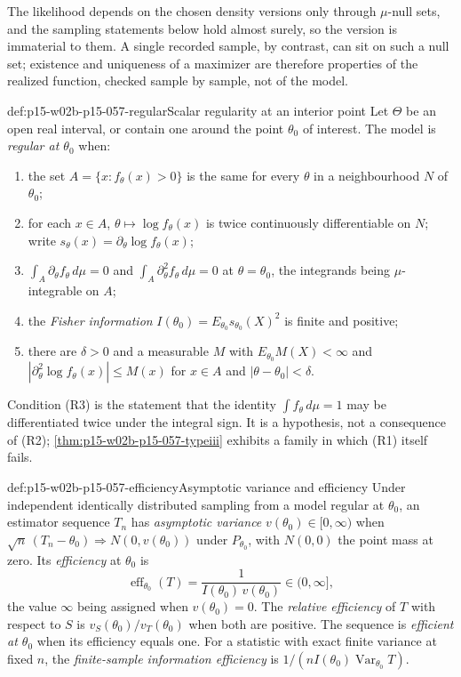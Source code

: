The likelihood depends on the chosen density versions only through
\(\mu\)-null sets, and the sampling statements below hold almost surely,
so the version is immaterial to them. A single recorded sample, by
contrast, can sit on such a null set; existence and uniqueness of a
maximizer are therefore properties of the realized function, checked
sample by sample, not of the model.

\begin{hbdefinition}{def:p15-w02b-p15-057-regular}{Scalar regularity at an interior point}
Let \(\Theta\) be an open real interval, or contain one around the point
\(\theta_0\) of interest. The model is \emph{regular at \(\theta_0\)} when:
\begin{enumerate}
\item[(R1)] the set \(A=\{x:f_\theta(x)>0\}\) is the same for every
 \(\theta\) in a neighbourhood \(N\) of \(\theta_0\);
\item[(R2)] for each \(x\in A\), \(\theta\mapsto\log f_\theta(x)\) is twice
 continuously differentiable on \(N\); write
 \(s_\theta(x)=\partial_\theta\log f_\theta(x)\);
\item[(R3)] \(\int_A\partial_\theta f_\theta\,d\mu=0\) and
 \(\int_A\partial_\theta^2f_\theta\,d\mu=0\) at \(\theta=\theta_0\), the
 integrands being \(\mu\)-integrable on \(A\);
\item[(R4)] the \emph{Fisher information}
 \(I(\theta_0)=E_{\theta_0}s_{\theta_0}(X)^2\) is finite and positive;
\item[(R5)] there are \(\delta>0\) and a measurable \(M\) with
 \(E_{\theta_0}M(X)<\infty\) and
 \(|\partial_\theta^2\log f_\theta(x)|\leq M(x)\) for \(x\in A\) and
 \(|\theta-\theta_0|<\delta\).
\end{enumerate}
\end{hbdefinition}

Condition (R3) is the statement that the identity \(\int f_\theta\,d\mu=1\)
may be differentiated twice under the integral sign. It is a hypothesis,
not a consequence of (R2); \cref{thm:p15-w02b-p15-057-typeiii} exhibits a
family in which (R1) itself fails.

\begin{hbdefinition}{def:p15-w02b-p15-057-efficiency}{Asymptotic variance and efficiency}
Under independent identically distributed sampling from a model regular at
\(\theta_0\), an estimator sequence \(T_n\) has \emph{asymptotic variance}
\(v(\theta_0)\in[0,\infty)\) when
\(\sqrt n\,(T_n-\theta_0)\Rightarrow N(0,v(\theta_0))\) under
\(P_{\theta_0}\), with \(N(0,0)\) the point mass at zero. Its
\emph{efficiency} at \(\theta_0\) is
\[
 \operatorname{eff}_{\theta_0}(T)=\frac{1}{I(\theta_0)\,v(\theta_0)}
 \in(0,\infty],
\]
the value \(\infty\) being assigned when \(v(\theta_0)=0\). The
\emph{relative efficiency} of \(T\) with respect to \(S\) is
\(v_S(\theta_0)/v_T(\theta_0)\) when both are positive. The sequence is
\emph{efficient at \(\theta_0\)} when its efficiency equals one. For a
statistic with exact finite variance at fixed \(n\), the
\emph{finite-sample information efficiency} is
\(1/(nI(\theta_0)\operatorname{Var}_{\theta_0}T)\).
\end{hbdefinition}

